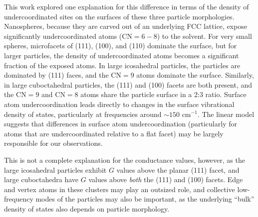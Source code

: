 This work explored one explanation for this difference in terms of the
density of undercoordinated sites on the surfaces of these three
particle morphologies. Nanospheres, because they are carved out of an
underlying FCC lattice, expose significantly undercoordinated atoms
($\text{CN} = 6-8$) to the solvent. For very small spheres,
microfacets of (111), (100), and (110) dominate the surface, but for
larger particles, the density of undercoordinated atoms becomes a
significant fraction of the exposed atoms.  In large icosahedral
particles, the particles are dominated by (111) faces, and the
$\text{CN} = 9$ atoms dominate the surface.  Similarly, in large
cuboctahedral particles, the (111) and (100) facets are both present,
and the $\text{CN} = 9$ and $\text{CN} = 8$ atoms share the particle
surface in a 2:3 ratio. Surface atom undercoordination leads directly
to changes in the surface vibrational density of states, particularly
at frequencies around $\sim 150 \text{~cm}^{-1}$.  The linear model
suggests that differences in surface atom undercoordination
(particularly for atoms that are undercoordinated relative to a flat
facet) may be largely responsible for our observations.

This is not a complete explanation for the conductance values,
however, as the large icosahedral particles exhibit $G$ values above
the planar (111) facet, and large cuboctahedra have $G$ values above
\textit{both} the (111) and (100) facets.  Edge and vertex atoms in
these clusters may play an outsized role, and collective low-frequency
modes of the particles may also be important, as the underlying
``bulk'' density of states also depends on particle morphology.



%


%

%
